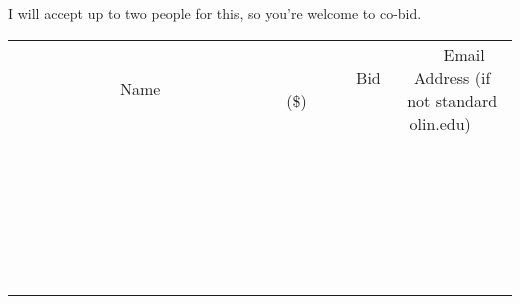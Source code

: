\documentclass[11pt]{article}
\begin{document}
I will accept up to two people for this, so you're welcome to co-bid.
\\[6ex]
\begin{tabular}{c c c}
~~~~~~~~~~~~~Name~~~~~~~~~~~~~ & ~~~~~~~~~Bid (\$)~~~~~~~~~  & ~~~Email Address (if not standard olin.edu)~~~\\
 & & \\
\hline
 & & \\
\hline
 & & \\
\hline
 & & \\
\hline
 & & \\
\hline
 & & \\
\hline
 & & \\
\hline
 & & \\
\hline
 & & \\
\hline
 & & \\
\hline
 & & \\
\hline
 & & \\
\hline
 & & \\
\hline
 & & \\
\hline
 & & \\
\hline
 & & \\
\hline
 & & \\
\hline
 & & \\
\hline
 & & \\
\hline
 & & \\
\hline
 & & \\
\hline
 & & \\
\hline
 & & \\
\hline
 & & \\
\hline
 & & \\
\hline
 & & \\
\hline
\end{tabular}
\newpage
\end{document}
